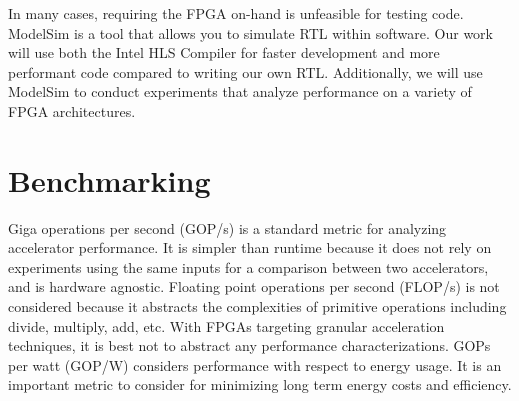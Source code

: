 In many cases, requiring the FPGA on-hand is unfeasible for testing code. ModelSim is a tool that allows you to simulate RTL within software. Our work will use both the Intel HLS Compiler for faster development and more performant code compared to writing our own RTL. Additionally, we will use ModelSim to conduct experiments that analyze performance on a variety of FPGA architectures.

\section{Benchmarking}
Giga operations per second (GOP/s) is a standard metric for analyzing accelerator performance. It is simpler than runtime because it does not rely on experiments using the same inputs for a comparison between two accelerators, and is hardware agnostic. Floating point operations per second (FLOP/s) is not considered because it abstracts the complexities of primitive operations including divide, multiply, add, etc. With FPGAs targeting granular acceleration techniques, it is best not to abstract any performance characterizations. GOPs per watt (GOP/W) considers performance with respect to energy usage. It is an important metric to consider for minimizing long term energy costs and efficiency.

